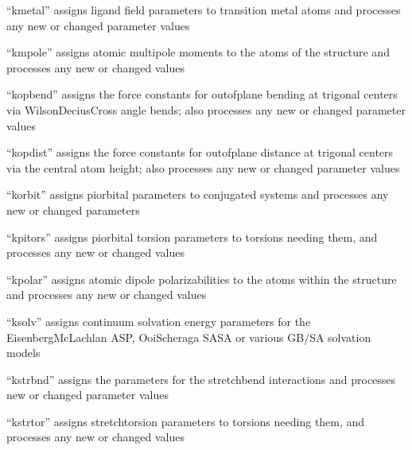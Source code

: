 \documentclass[letterpaper,11pt,english]{sphinxmanual}
\begin{document}

“kmetal” assigns ligand field parameters to transition metal atoms and processes any new or changed parameter values


“kmpole” assigns atomic multipole moments to the atoms of the structure and processes any new or changed values


“kopbend” assigns the force constants for out\sphinxhyphen{}of\sphinxhyphen{}plane bending at trigonal centers via Wilson\sphinxhyphen{}Decius\sphinxhyphen{}Cross angle bends; also processes any new or changed parameter values


“kopdist” assigns the force constants for out\sphinxhyphen{}of\sphinxhyphen{}plane distance at trigonal centers via the central atom height; also processes any new or changed parameter values


“korbit” assigns pi\sphinxhyphen{}orbital parameters to conjugated systems and processes any new or changed parameters


“kpitors” assigns pi\sphinxhyphen{}orbital torsion parameters to torsions needing them, and processes any new or changed values


“kpolar” assigns atomic dipole polarizabilities to the atoms within the structure and processes any new or changed values


“ksolv” assigns continuum solvation energy parameters for the Eisenberg\sphinxhyphen{}McLachlan ASP, Ooi\sphinxhyphen{}Scheraga SASA or various GB/SA solvation models


“kstrbnd” assigns the parameters for the stretch\sphinxhyphen{}bend interactions and processes new or changed parameter values


“kstrtor” assigns stretch\sphinxhyphen{}torsion parameters to torsions needing them, and processes any new or changed values
\end{document}
